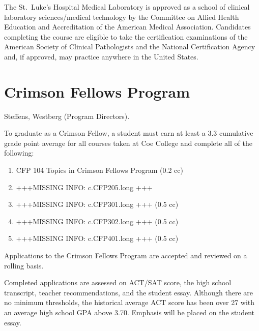 \documentclass[
  letterpaper,
]{scrbook}
\providecommand{\tightlist}{%
  \setlength{\itemsep}{0pt}\setlength{\parskip}{0pt}}
\begin{document}
The St.~Luke's Hospital Medical Laboratory is approved as a school of
clinical laboratory sciences/medical technology by the Committee on
Allied Health Education and Accreditation of the American Medical
Association. Candidates completing the course are eligible to take the
certification examinations of the American Society of Clinical
Pathologists and the National Certification Agency and, if approved, may
practice anywhere in the United States.

\hypertarget{crimson-fellows-program}{%
\section{Crimson Fellows Program}\label{crimson-fellows-program}}

Steffens, Westberg (Program Directors).

To graduate as a Crimson Fellow, a student must earn at least a 3.3
cumulative grade point average for all courses taken at Coe College and
complete all of the following:

\begin{enumerate}
\def\labelenumi{\arabic{enumi}.}
\tightlist
\item
  CFP 104 Topics in Crimson Fellows Program (0.2 cc)
\item
  +++MISSING INFO: c.CFP205.long +++
\item
  +++MISSING INFO: c.CFP301.long +++ (0.5 cc)
\item
  +++MISSING INFO: c.CFP302.long +++ (0.5 cc)
\item
  +++MISSING INFO: c.CFP401.long +++ (0.5 cc)
\end{enumerate}

Applications to the Crimson Fellows Program are accepted and reviewed on
a rolling basis.

Completed applications are assessed on ACT/SAT score, the high school
transcript, teacher recommendations, and the student essay. Although
there are no minimum thresholds, the historical average ACT score has
been over 27 with an average high school GPA above 3.70. Emphasis will
be placed on the student essay.
\end{document}
